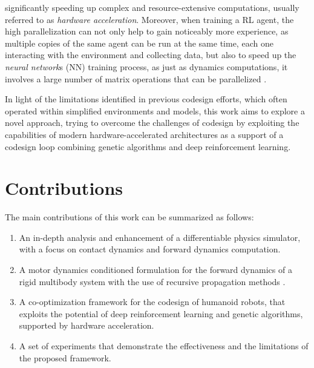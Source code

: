 significantly speeding up complex and resource-extensive computations, usually referred to as \textit{hardware acceleration}. Moreover, when training a \ac{RL} agent, the high parallelization can not only help to gain noticeably more experience, as multiple copies of the same agent can be run at the same time, each one interacting with the environment and collecting data, but also to speed up the \textit{neural network}s (\ac{NN}) training process, as just as dynamics computations, it involves a large number of matrix operations that can be parallelized \citep{pandey_transformational_2022,gyawali_comparative_2023}.

In light of the limitations identified in previous codesign efforts, which often operated within simplified environments and models, this work aims to explore a novel approach, trying to overcome the challenges of codesign by exploiting the capabilities of modern hardware-accelerated architectures as a support of a codesign loop combining genetic algorithms and deep reinforcement learning.

\section*{Contributions}

The main contributions of this work can be summarized as follows:

\begin{enumerate}
    \item An in-depth analysis and enhancement of a differentiable physics simulator, with a focus on contact dynamics and forward dynamics computation.
    \item A motor dynamics conditioned formulation for the forward dynamics of a rigid multibody system with the use of recursive propagation methods .
    \item A co-optimization  framework for the codesign of humanoid robots, that exploits the potential of deep reinforcement learning and genetic algorithms, supported by hardware acceleration.
    \item A set of experiments that demonstrate the effectiveness and the limitations of the proposed framework.
\end{enumerate}


